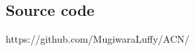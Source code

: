 \documentclass[a0,portrait]{a0poster}
\begin{document}
\begin{multicols}{2}




\color{DarkSlateGray} %




\nocite{*} %


\subsection*{Source code}
https://github.com/MugiwaraLuffy/ACN/



\end{multicols}
\end{document}
